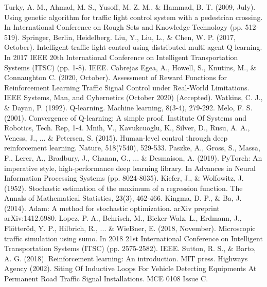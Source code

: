 \documentclass[a4paper, conference]{IEEEtran}
\begin{document}
\begin{thebibliography}{0}
 Turky, A. M., Ahmad, M. S., Yusoff, M. Z. M., \& Hammad, B. T. (2009, July). Using genetic algorithm for traffic light control system with a pedestrian crossing. In International Conference on Rough Sets and Knowledge Technology (pp. 512-519). Springer, Berlin, Heidelberg.
 Liu, Y., Liu, L., \& Chen, W. P. (2017, October). Intelligent traffic light control using distributed multi-agent Q learning. In 2017 IEEE 20th International Conference on Intelligent Transportation Systems (ITSC) (pp. 1-8). IEEE.
 Cabrejas Egea, A., Howell, S., Knutins, M., \& Connaughton C. (2020, October). Assessment of Reward Functions for Reinforcement Learning Traffic Signal Control under Real-World Limitations. IEEE Systems, Man, and Cybernetics (October 2020) (Accepted). 
 Watkins, C. J., \& Dayan, P. (1992). Q-learning. Machine learning, 8(3-4), 279-292.
 Melo, F. S. (2001). Convergence of Q-learning: A simple proof. Institute Of Systems and Robotics, Tech. Rep, 1-4.
 Mnih, V., Kavukcuoglu, K., Silver, D., Rusu, A. A., Veness, J.,  ... \& Petersen, S. (2015). Human-level control through deep reinforcement learning. Nature, 518(7540), 529-533.
 Paszke, A., Gross, S., Massa, F., Lerer, A., Bradbury, J., Chanan, G., ... \& Desmaison, A. (2019). PyTorch: An imperative style, high-performance deep learning library. In Advances in Neural Information Processing Systems (pp. 8024-8035).
 Kiefer, J., \& Wolfowitz, J. (1952). Stochastic estimation of the maximum of a regression function. The Annals of Mathematical Statistics, 23(3), 462-466.
 Kingma, D. P., \& Ba, J. (2014). Adam: A method for stochastic optimization. arXiv preprint arXiv:1412.6980.
 Lopez, P. A., Behrisch, M., Bieker-Walz, L., Erdmann, J., Flötteröd, Y. P., Hilbrich, R., ... \& WieBner, E. (2018, November). Microscopic traffic simulation using sumo. In 2018 21st International Conference on Intelligent Transportation Systems (ITSC) (pp. 2575-2582). IEEE.
 Sutton, R. S., \& Barto, A. G. (2018). Reinforcement learning: An introduction. MIT press.
 Highways Agency (2002). Siting Of Inductive Loops For Vehicle Detecting Equipments At Permanent Road Traffic Signal Installations. MCE 0108 Issue C.
\end{thebibliography}


\end{document}
